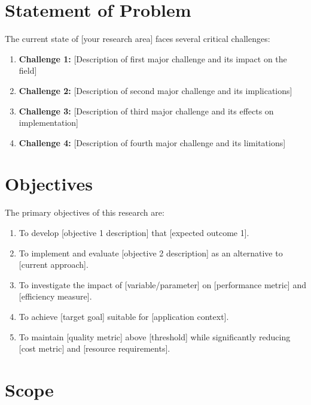 \section{Statement of Problem}

The current state of [your research area] faces several critical challenges:

\begin{enumerate}
\item \textbf{Challenge 1:} [Description of first major challenge and its impact on the field]

\item \textbf{Challenge 2:} [Description of second major challenge and its implications]

\item \textbf{Challenge 3:} [Description of third major challenge and its effects on implementation]

\item \textbf{Challenge 4:} [Description of fourth major challenge and its limitations]
\end{enumerate}

\section{Objectives}

The primary objectives of this research are:

\begin{enumerate}
\item To develop [objective 1 description] that [expected outcome 1].

\item To implement and evaluate [objective 2 description] as an alternative to [current approach].

\item To investigate the impact of [variable/parameter] on [performance metric] and [efficiency measure].

\item To achieve [target goal] suitable for [application context].

\item To maintain [quality metric] above [threshold] while significantly reducing [cost metric] and [resource requirements].
\end{enumerate}

\section{Scope}

